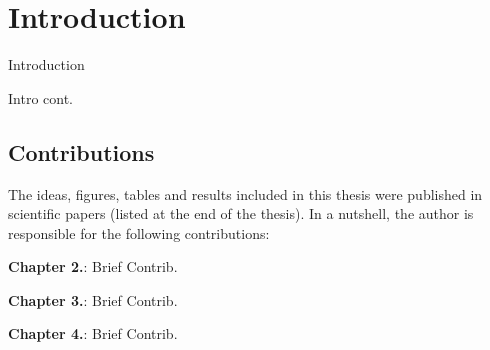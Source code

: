 \chapter{Introduction}

Introduction
\vfill
\newpage

Intro cont.
\section{Contributions}

The ideas, figures, tables and results included in this thesis were published in scientific papers (listed at the end of the thesis). In a nutshell, the author is responsible for the following contributions:

\vspace*{1em}

\noindent
\textbf{Chapter 2.}: Brief Contrib.

\vspace*{1em}

\noindent
\textbf{Chapter 3.}: Brief Contrib.

\vspace*{1em}

\noindent
\textbf{Chapter 4.}: Brief Contrib.



